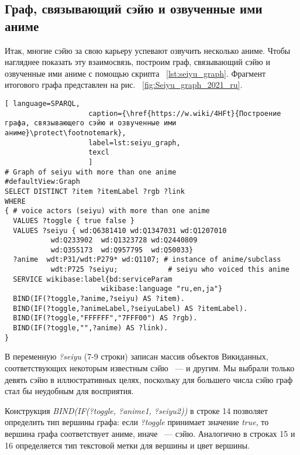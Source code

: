 \subsection{Граф, связывающий сэйю и озвученные ими аниме}

Итак, многие сэйю за свою карьеру успевают озвучить несколько аниме. Чтобы нагляднее показать эту взаимосвязь, построим граф, связывающий сэйю и озвученные ими аниме с помощью скрипта ~\protect\ref{lst:seiyu_graph}. Фрагмент итогового графа представлен на рис. ~\ref{fig:Seiyu_graph_2021_ru}. 

\lstset{numbers=left, firstnumber=1, frame=single}
\begin{lstlisting}[ language=SPARQL, 
                    caption={\href{https://w.wiki/4HFt}{Построение графа, связывающего сэйю и озвученные ими аниме}\protect\footnotemark},
                    label=lst:seiyu_graph,
                    texcl 
                    ]
# Graph of seiyu with more than one anime
#defaultView:Graph
SELECT DISTINCT ?item ?itemLabel ?rgb ?link
WHERE
{ # voice actors (seiyu) with more than one anime
  VALUES ?toggle { true false }
  VALUES ?seiyu { wd:Q6381410 wd:Q1347031 wd:Q1207010 
           wd:Q233902  wd:Q1323728 wd:Q2440809 
           wd:Q355173  wd:Q957795  wd:Q50033}
  ?anime  wdt:P31/wdt:P279* wd:Q1107; # instance of anime/subclass
           wdt:P725 ?seiyu;            # seiyu who voiced this anime 
  SERVICE wikibase:label{bd:serviceParam
					   wikibase:language "ru,en,ja"}
  BIND(IF(?toggle,?anime,?seiyu) AS ?item).
  BIND(IF(?toggle,?animeLabel,?seiyuLabel) AS ?itemLabel).
  BIND(IF(?toggle,"FFFFFF","7FFF00") AS ?rgb).
  BIND(IF(?toggle,"",?anime) AS ?link).
}
\end{lstlisting}%
\lstset{numbers=none}

В переменную \emph{?seiyu} (\num{7}-\num{9} строки) записан массив объектов Викиданных, соответствующих некоторым известным сэйю ~---  и другим. Мы выбрали только девять сэйю в иллюстративных целях, поскольку для большего числа сэйю граф стал бы неудобным для восприятия.

Конструкция \emph{BIND(IF(?toggle, ?anime1, ?seiyu2))} в строке \num{14} позволяет определить тип вершины графа: если \emph{?toggle} принимает значение \emph{true}, то вершина графа соответствует аниме, иначе ~--- сэйю. Аналогично в строках \num{15} и \num{16} определяется тип текстовой метки для вершины и цвет вершины.


